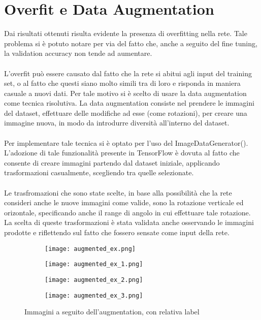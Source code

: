 \section{Overfit e Data Augmentation}
Dai risultati ottenuti risulta evidente la presenza di overfitting nella rete.
Tale problema si è potuto notare per via del fatto che, anche a seguito del fine tuning, la validation accuracy non tende 
ad aumentare.
\\\\
L'overfit può essere causato dal fatto che la rete si abitui agli input del training set, o al 
fatto che questi siano molto simili tra di loro e risponda in maniera casuale a nuovi dati. Per tale motivo si è scelto di usare la data augmentation come tecnica risolutiva.
La data augmentation consiste nel prendere le immagini del dataset, effettuare delle modifiche ad esse (come rotazioni), per 
creare una immagine nuova, in modo da introdurre diversità all'interno del dataset. 
\\\\
Per implementare tale tecnica si è optato per l'uso del ImageDataGenerator(). L'adozione di tale funzionalità presente in 
TensorFlow è dovuta al fatto che consente di creare immagini partendo dal dataset iniziale, applicando trasformazioni casualmente, scegliendo tra 
quelle selezionate.
\\\\
Le trasfromazioni che sono state scelte, in base alla possibilità che la rete consideri anche le nuove immagini come 
valide, sono la rotazione verticale ed orizontale, specificando anche il range di angolo in cui effettuare tale rotazione.
La scelta di queste trasformazioni è stata validata anche osservando le immagini prodotte e riflettendo sul fatto che fossero 
sensate come input della rete.
\begin{figure}[h]
    \centering
    \begin{subfigure}{.45\textwidth}
        \centering
        \texttt{[image: augmented\_ex.png]}  
    \end{subfigure}
    \begin{subfigure}{.45\textwidth}
        \centering
        \texttt{[image: augmented\_ex\_1.png]}  
    \end{subfigure}
    \begin{subfigure}{.45\textwidth}
        \centering
        \texttt{[image: augmented\_ex\_2.png]}  
    \end{subfigure}
    \begin{subfigure}{.45\textwidth}
        \centering
        \texttt{[image: augmented\_ex\_3.png]}  
    \end{subfigure}
    \caption{Immagini a seguito dell'augmentation, con relativa label}
    \label{Augmentation}
\end{figure}
